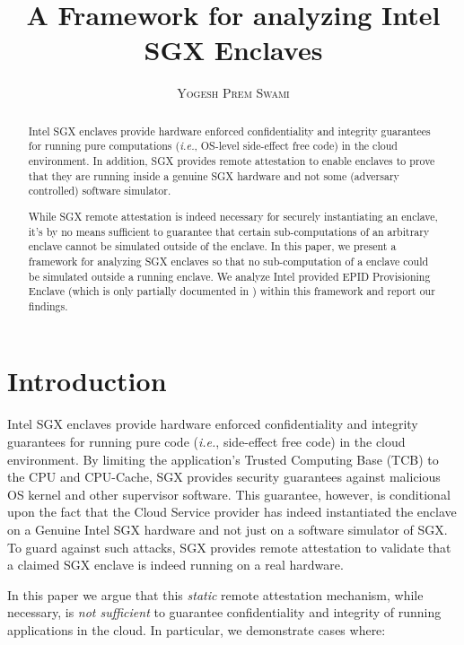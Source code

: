\documentclass[11pt]{article}
\title{\bf A Framework for analyzing Intel SGX Enclaves}
\author{\textsc{Yogesh Prem Swami}}
\date{\lastupdate}
\newcommand{\ie}{\textit{i.e.}}
\begin{document}

\maketitle

\begin{abstract}
  Intel SGX enclaves \cite{sgxinnov, sgxinnov2} provide hardware
  enforced confidentiality and integrity guarantees for running pure
  computations (\ie, OS-level side-effect free code) in the cloud
  environment. In addition, SGX provides remote attestation to enable
  enclaves to prove that they are running inside a genuine SGX
  hardware and not some (adversary controlled) software simulator.

  While SGX remote attestation is indeed necessary for securely
  instantiating an enclave, it's by no means sufficient to guarantee
  that certain sub-computations of an arbitrary enclave cannot be
  simulated outside of the enclave. In this paper, we present a
  framework for analyzing SGX enclaves so that no sub-computation of a
  enclave could be simulated outside a running enclave. We analyze
  Intel provided EPID\cite{epid} Provisioning Enclave (which is only
  partially documented in \cite{sgxattest}) within this framework and
  report our findings.
\end{abstract}

\section{Introduction}
    Intel SGX enclaves provide hardware enforced confidentiality and
    integrity guarantees for running pure code (\textit{i.e.},
    side-effect free code) in the cloud environment. By limiting the
    application's Trusted Computing Base (TCB) to the CPU and
    CPU-Cache, SGX provides security guarantees against malicious OS
    kernel and other supervisor software. This guarantee, however, is
    conditional upon the fact that the Cloud Service provider has
    indeed instantiated the enclave on a Genuine Intel SGX hardware
    and not just on a software simulator of SGX. To guard against such
    attacks, SGX provides remote attestation to validate that a
    claimed SGX enclave is indeed running on a real hardware.

    In this paper we argue that this \textit{static} remote
    attestation mechanism, while necessary, is \textit{not sufficient}
    to guarantee confidentiality and integrity of running applications
    in the cloud. In particular, we demonstrate cases where:
\end{document}
